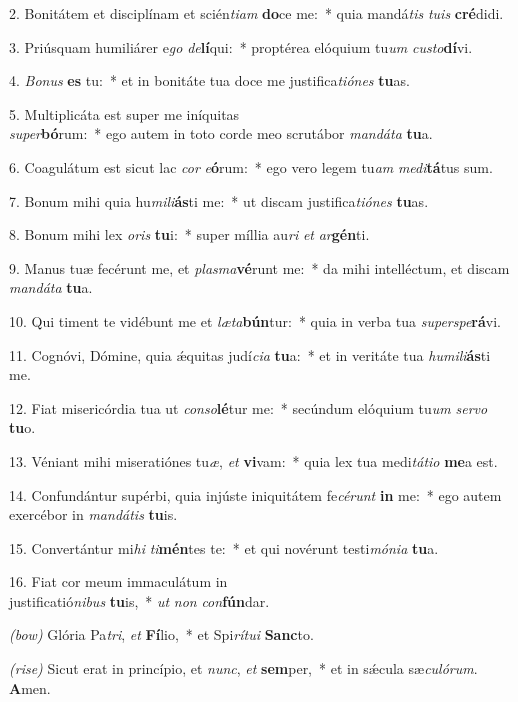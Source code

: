 ﻿2. Bonitátem et disciplínam et scién\textit{ti}\textit{am} \textbf{do}ce me:~* quia mandá\textit{tis} \textit{tu}\textit{is} \textbf{cré}didi.

3. Priúsquam humiliárer e\textit{go} \textit{de}\textbf{lí}qui:~* proptérea elóquium tu\textit{um} \textit{cus}\textit{to}\textbf{dí}vi.

4. \textit{Bo}\textit{nus} \textbf{es} tu:~* et in bonitáte tua doce me justifica\textit{ti}\textit{ó}\textit{nes} \textbf{tu}as.

5. Multiplicáta est super me iníquitas\\ \textit{su}\textit{per}\textbf{bó}rum:~* ego autem in toto corde meo scrutábor \textit{man}\textit{dá}\textit{ta} \textbf{tu}a.

6. Coagulátum est sicut lac \textit{cor} \textit{e}\textbf{ó}rum:~* ego vero legem tu\textit{am} \textit{me}\textit{di}\textbf{tá}tus sum.

7. Bonum mihi quia hu\textit{mi}\textit{li}\textbf{ás}ti me:~* ut discam justifica\textit{ti}\textit{ó}\textit{nes} \textbf{tu}as.

8. Bonum mihi lex \textit{o}\textit{ris} \textbf{tu}i:~* super míllia au\textit{ri} \textit{et} \textit{ar}\textbf{gén}ti.

9. Manus tuæ fecérunt me, et \textit{plas}\textit{ma}\textbf{vé}runt me:~* da mihi intelléctum, et discam \textit{man}\textit{dá}\textit{ta} \textbf{tu}a.

10. Qui timent te vidébunt me et \textit{læ}\textit{ta}\textbf{bún}tur:~* quia in verba tua \textit{su}\textit{per}\textit{spe}\textbf{rá}vi.

11. Cognóvi, Dómine, quia ǽquitas judí\textit{ci}\textit{a} \textbf{tu}a:~* et in veritáte tua \textit{hu}\textit{mi}\textit{li}\textbf{ás}ti me.

12. Fiat misericórdia tua ut \textit{con}\textit{so}\textbf{lé}tur me:~* secúndum elóquium tu\textit{um} \textit{ser}\textit{vo} \textbf{tu}o.

13. Véniant mihi miseratiónes tu\textit{æ}, \textit{et} \textbf{vi}vam:~* quia lex tua medi\textit{tá}\textit{ti}\textit{o} \textbf{me}a est.

14. Confundántur supérbi, quia injúste iniquitátem fe\textit{cé}\textit{runt} \textbf{in} me:~* ego autem exercébor in \textit{man}\textit{dá}\textit{tis} \textbf{tu}is.

15. Convertántur mi\textit{hi} \textit{ti}\textbf{mén}tes te:~* et qui novérunt testi\textit{mó}\textit{ni}\textit{a} \textbf{tu}a.

16. Fiat cor meum immaculátum in\\ justificatió\textit{ni}\textit{bus} \textbf{tu}is,~* \textit{ut} \textit{non} \textit{con}\textbf{fún}dar.

{\color{red}\textit{(bow)}} Glória Pa\textit{tri}, \textit{et} \textbf{Fí}lio,~* et Spi\textit{rí}\textit{tu}\textit{i} \textbf{Sanc}to.

{\color{red}\textit{(rise)}} Sicut erat in princípio, et \textit{nunc}, \textit{et} \textbf{sem}per,~* et in sǽcula sæ\textit{cu}\textit{ló}\textit{rum}. \textbf{A}men.